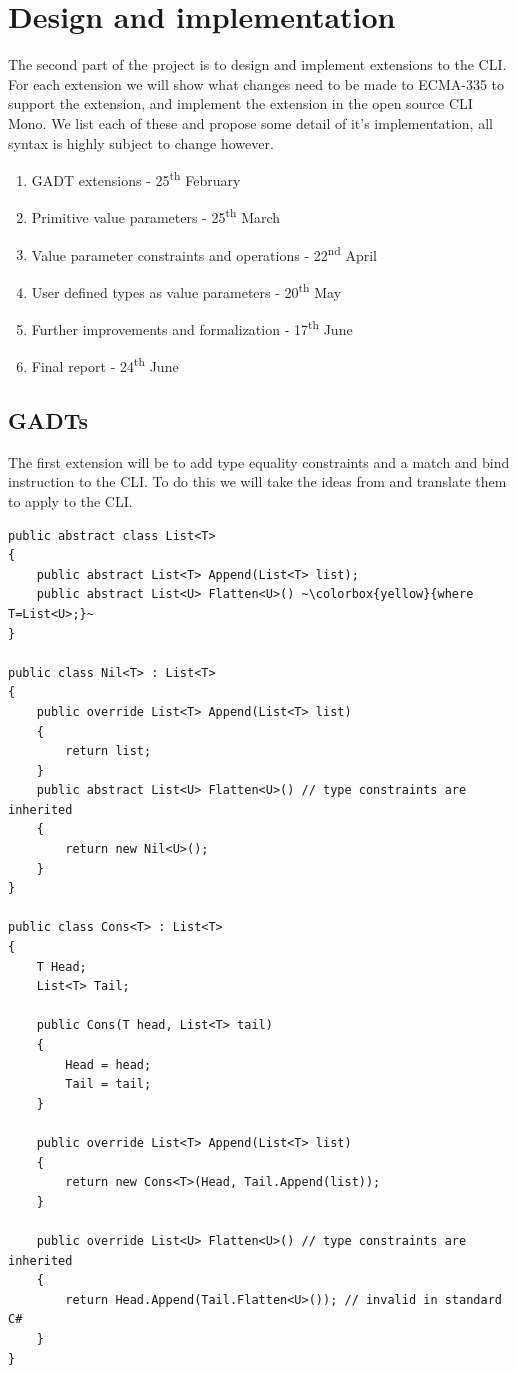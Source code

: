 \documentclass[english]{report}
\begin{document}
\section{Design and implementation}

The second part of the project is to design and implement extensions
to the CLI. For each extension we will show what changes need to be
made to ECMA-335 to support the extension, and implement the extension
in the open source CLI Mono. We list each of these and propose some
detail of it's implementation, all syntax is highly subject to change
however.
\begin{enumerate}
\item GADT extensions - 25\textsuperscript{th} February
\item Primitive value parameters - 25\textsuperscript{th} March
\item Value parameter constraints and operations - 22\textsuperscript{nd}
April
\item User defined types as value parameters - 20\textsuperscript{th} May
\item Further improvements and formalization - 17\textsuperscript{th} June
\item Final report - 24\textsuperscript{th} June
\end{enumerate}

\subsection{GADTs}

The first extension will be to add type equality constraints and a
match and bind instruction to the CLI. To do this we will take the
ideas from \cite{gadts} and translate them to apply to the CLI.

\begin{lstlisting}[caption={Type equality constraints in extended C\#\protect \\
Extension of listing \ref{lis:csharp gadt}},escapechar={~},keywordstyle={\color{blue}},language=sharpc]
public abstract class List<T>
{
	public abstract List<T> Append(List<T> list);
	public abstract List<U> Flatten<U>() ~\colorbox{yellow}{where T=List<U>;}~
}

public class Nil<T> : List<T>
{
	public override List<T> Append(List<T> list)
	{
		return list;
	}
	public abstract List<U> Flatten<U>() // type constraints are inherited
	{
		return new Nil<U>();
	}
}

public class Cons<T> : List<T>
{
	T Head;
	List<T> Tail;

	public Cons(T head, List<T> tail) 
	{
		Head = head;
		Tail = tail;
	}

	public override List<T> Append(List<T> list)
	{
		return new Cons<T>(Head, Tail.Append(list));
	}

	public override List<U> Flatten<U>() // type constraints are inherited
	{
		return Head.Append(Tail.Flatten<U>()); // invalid in standard C#
	}
}
\end{lstlisting}
\end{document}
